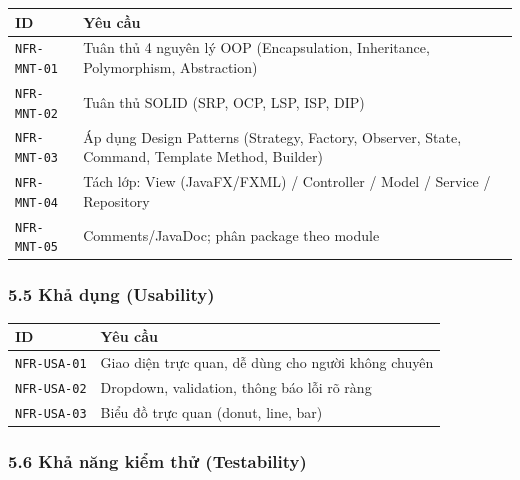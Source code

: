 \documentclass[11pt,a4paper]{article}
\newcounter{none}
\newcommand{\faintline}{%
  \noalign{\global\arrayrulecolor{faintgray}}%
  \hline
  \noalign{\global\arrayrulecolor{black}}%
} %
\begin{document}
{\def\LTcaptype{none}
\begin{longtable}[]{@{}
  >{\raggedright\arraybackslash}p{}
  >{\raggedright\arraybackslash}p{}@{}}
\toprule\noalign{}
\begin{minipage}[b]{\linewidth}\raggedright
ID
\end{minipage} & \begin{minipage}[b]{\linewidth}\raggedright
Yêu cầu
\end{minipage} \\
\midrule\noalign{}
\endhead
\bottomrule\noalign{}
\endlastfoot
\texttt{NFR-MNT-01} & Tuân thủ 4 nguyên lý OOP (Encapsulation, Inheritance, Polymorphism, Abstraction) \\ \faintline
\texttt{NFR-MNT-02} & Tuân thủ SOLID (SRP, OCP, LSP, ISP, DIP) \\ \faintline
\texttt{NFR-MNT-03} & Áp dụng Design Patterns (Strategy, Factory, Observer, State, Command, Template Method, Builder) \\ \faintline
\texttt{NFR-MNT-04} & Tách lớp: View (JavaFX/FXML) / Controller / Model / Service / Repository \\ \faintline
\texttt{NFR-MNT-05} & Comments/JavaDoc; phân package theo module \\
\end{longtable}
}

\subsubsection{5.5 Khả dụng (Usability)}\label{khux1ea3-dux1ee5ng-usability}

{\def\LTcaptype{none}
\begin{longtable}[]{@{}
  >{\raggedright\arraybackslash}p{}
  >{\raggedright\arraybackslash}p{}@{}}
\toprule\noalign{}
ID & Yêu cầu \\
\midrule\noalign{}
\endhead
\bottomrule\noalign{}
\endlastfoot
\texttt{NFR-USA-01} & Giao diện trực quan, dễ dùng cho người không chuyên \\ \faintline
\texttt{NFR-USA-02} & Dropdown, validation, thông báo lỗi rõ ràng \\ \faintline
\texttt{NFR-USA-03} & Biểu đồ trực quan (donut, line, bar) \\
\end{longtable}
}

\subsubsection{5.6 Khả năng kiểm thử (Testability)}\label{khux1ea3-nux103ng-kiux1ec3m-thux1eed-testability}
\end{document}
